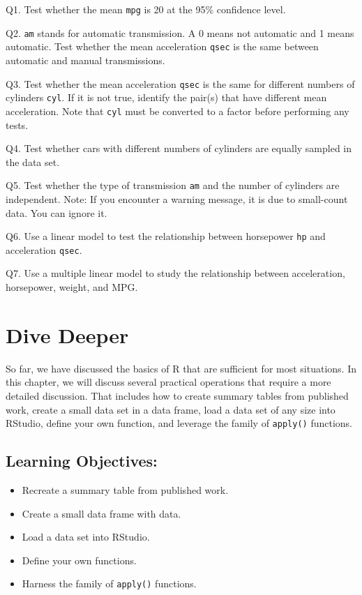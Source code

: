 \documentclass[
  letterpaper,
  DIV=11,
  numbers=noendperiod]{scrreprt}
\begin{document}
Q1. Test whether the mean \texttt{mpg} is 20 at the 95\% confidence
level.

Q2. \texttt{am} stands for automatic transmission. A 0 means not
automatic and 1 means automatic. Test whether the mean acceleration
\texttt{qsec} is the same between automatic and manual transmissions.

Q3. Test whether the mean acceleration \texttt{qsec} is the same for
different numbers of cylinders \texttt{cyl}. If it is not true, identify
the pair(s) that have different mean acceleration. Note that
\texttt{cyl} must be converted to a factor before performing any tests.

Q4. Test whether cars with different numbers of cylinders are equally
sampled in the data set.

Q5. Test whether the type of transmission \texttt{am} and the number of
cylinders are independent. Note: If you encounter a warning message, it
is due to small-count data. You can ignore it.

Q6. Use a linear model to test the relationship between horsepower
\texttt{hp} and acceleration \texttt{qsec}.

Q7. Use a multiple linear model to study the relationship between
acceleration, horsepower, weight, and MPG.

\chapter{Dive Deeper}\label{sec-05-dive-deeper}

So far, we have discussed the basics of R that are sufficient for most
situations. In this chapter, we will discuss several practical
operations that require a more detailed discussion. That includes how to
create summary tables from published work, create a small data set in a
data frame, load a data set of any size into RStudio, define your own
function, and leverage the family of \texttt{apply()} functions.

\section*{Learning Objectives:}\label{learning-objectives-4}


\begin{itemize}
\item
  Recreate a summary table from published work.
\item
  Create a small data frame with data.
\item
  Load a data set into RStudio.
\item
  Define your own functions.
\item
  Harness the family of \texttt{apply()} functions.
\end{itemize}
\end{document}
